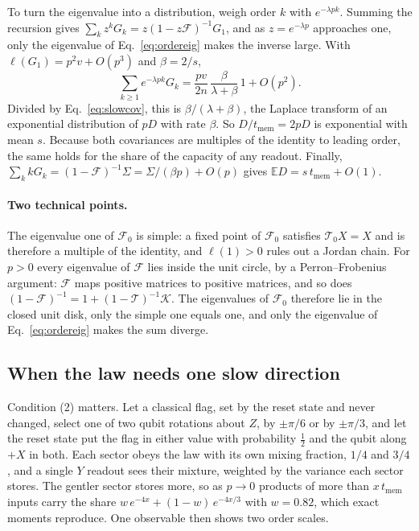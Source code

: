 To turn the eigenvalue into a distribution, weigh order $k$ with $e^{-\lambda pk}$. Summing the recursion gives
$\sum_kz^kG_k=z(1-z\mathcal F)^{-1}G_1$, and as $z=e^{-\lambda p}$ approaches one, only the eigenvalue of
Eq.~\eqref{eq:ordereig} makes the inverse large. With $\ell(G_1)=p^2v+O(p^3)$ and $\beta=2/s$,
\begin{equation}
  \sum_{k\ge1}e^{-\lambda pk}G_k=\frac{pv}{2n}\,\frac{\beta}{\lambda+\beta}\,1+O(p^2).
  \label{eq:laplace}
\end{equation}
Divided by Eq.~\eqref{eq:slowcov}, this is $\beta/(\lambda+\beta)$, the Laplace transform of an exponential
distribution of $pD$ with rate $\beta$. So $D/t_{\mathrm{mem}}=2pD$ is exponential with mean $s$. Because both
covariances are multiples of the identity to leading order, the same holds for the share of the capacity of any
readout. Finally, $\sum_kkG_k=(1-\mathcal F)^{-1}\Sigma=\Sigma/(\beta p)+O(p)$ gives
$\mathbb ED=s\,t_{\mathrm{mem}}+O(1)$.

\paragraph{Two technical points.}
The eigenvalue one of $\mathcal F_0$ is simple: a fixed point of $\mathcal F_0$ satisfies $\mathcal T_0X=X$ and is
therefore a multiple of the identity, and $\ell(1)>0$ rules out a Jordan chain. For $p>0$ every eigenvalue of
$\mathcal F$ lies inside the unit circle, by a Perron--Frobenius argument: $\mathcal F$ maps positive matrices to
positive matrices, and so does $(1-\mathcal F)^{-1}=1+(1-\mathcal T)^{-1}\mathcal K$. The eigenvalues of
$\mathcal F_0$ therefore lie in the closed unit disk, only the simple one equals one, and only the eigenvalue of
Eq.~\eqref{eq:ordereig} makes the sum diverge.

\subsection{When the law needs one slow direction}
Condition (2) matters. Let a classical flag, set by the reset state and never changed, select one of two qubit
rotations about $Z$, by $\pm\pi/6$ or by $\pm\pi/3$, and let the reset state put the flag in either value with
probability $\tfrac12$ and the qubit along $+X$ in both. Each sector obeys the law with its own mixing fraction,
$1/4$ and $3/4$, and a single $Y$ readout sees their mixture, weighted by the variance each sector stores. The
gentler sector stores more, so as $p\to0$ products of more than $x\,t_{\mathrm{mem}}$ inputs carry the share
$w\,e^{-4x}+(1-w)\,e^{-4x/3}$ with $w=0.82$, which exact moments reproduce. One observable then shows two order
scales.

